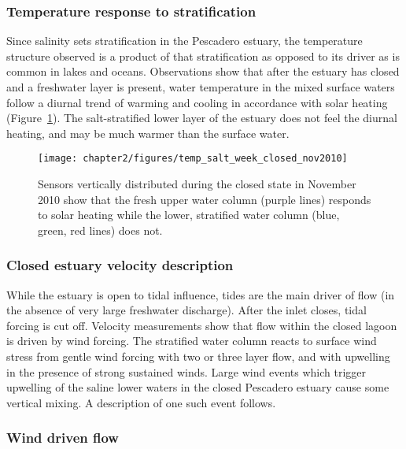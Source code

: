 \subsubsection{Temperature response to stratification} \label{sssec:TempResStrat}

Since salinity sets stratification in the Pescadero estuary, the temperature structure observed is a product of that stratification as opposed to its driver as is common in lakes and oceans. Observations show that after the estuary has closed and a freshwater layer is present, water temperature in the mixed surface waters follow a diurnal trend of warming and cooling in accordance with solar heating (Figure~\ref{fig:temp_and_strat}). The salt-stratified lower layer of the estuary does not feel the diurnal heating, and may be much warmer than the surface water. 

\begin{figure}
\centering
	\texttt{[image: chapter2/figures/temp\_salt\_week\_closed\_nov2010]}
	\caption{Sensors vertically distributed during the closed state in November 2010 show that the fresh upper water column (purple lines) responds to solar heating while the lower, stratified water column (blue, green, red lines) does not.} \label{fig:temp_and_strat}
\end{figure}

\subsubsection{Closed estuary velocity description} \label{cl_vel}
While the estuary is open to tidal influence, tides are the main driver of flow (in the absence of very large freshwater discharge). After the inlet closes, tidal forcing is cut off. Velocity measurements show that flow within the closed lagoon is driven by wind forcing. The stratified water column reacts to surface wind stress from gentle wind forcing with two or three layer flow, and with upwelling in the presence of strong sustained winds. Large wind events which trigger upwelling of the saline lower waters in the closed Pescadero estuary cause some vertical mixing. A description of one such event follows.

\subsubsection{Wind driven flow} \label{sssec:WindMixNov10}

